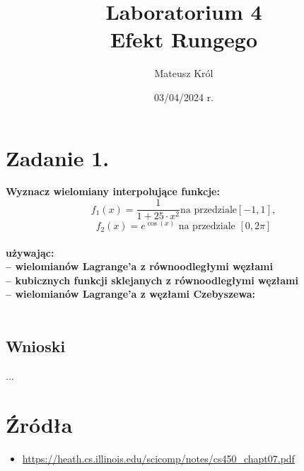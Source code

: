 \documentclass{article}
\title{%
Laboratorium 4\\
  \huge Efekt Rungego}
\author{Mateusz Król}
\date{03/04/2024 r.}
\begin{document}
\maketitle


\section*{Zadanie 1.}
\textbf{Wyznacz wielomiany interpolujące funkcje:}
$$f_1(x) = \frac{1}{1 + 25\cdot x^2} \mbox{na przedziale} [-1, 1], $$
$$f_2(x) = e^{\cos(x)} \mbox{ na przedziale } [0, 2\pi]$$
\\
\textbf{używając: \\
– wielomianów Lagrange’a z równoodległymi węzłami \\
– kubicznych funkcji sklejanych z równoodległymi węzłami \\
– wielomianów Lagrange’a z węzłami Czebyszewa:}
\\\\


\subsection*{Wnioski}
\null\quad ...

\section*{Źródła}
\begin{itemize}
    \item \url{https://heath.cs.illinois.edu/scicomp/notes/cs450_chapt07.pdf}
\end{itemize}
\end{document}
